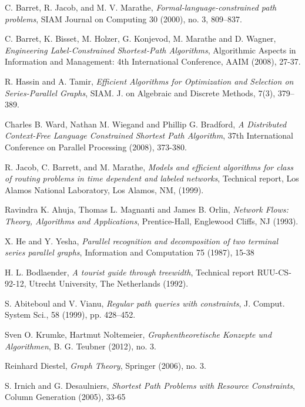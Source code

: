 \documentclass[]{article}
\numberwithin{equation}{section}
\begin{document}
\begin{thebibliography}{Lam00}
	C. Barret, R. Jacob, and M. V. Marathe,
	\emph{Formal-language-constrained path problems},
	SIAM Journal on Computing 30 (2000), no. 3, 809–837.
	
	C. Barret, K. Bisset, M. Holzer, G. Konjevod, M. Marathe and D. Wagner,
	\emph{Engineering Label-Constrained Shortest-Path Algorithms},
	Algorithmic Aspects in Information and Management: 4th International Conference, AAIM (2008), 27-37.
	
	R. Hassin and A. Tamir,
	\emph{Efficient Algorithms for Optimization and Selection on Series-Parallel Graphs},
	SIAM. J. on Algebraic and Discrete Methods, 7(3), 379–389.
	
	Charles B. Ward, Nathan M. Wiegand and Phillip G. Bradford,
	\emph{A Distributed Context-Free Language Constrained Shortest Path Algorithm},
	37th International Conference on Parallel Processing (2008), 373-380.
	
	R. Jacob, C. Barrett, and M. Marathe,
	\emph{Models and efficient algorithms for class of routing problems in time dependent and labeled networks},
	Technical report, Los Alamos National Laboratory, Los Alamos, NM, (1999).
	
	Ravindra K. Ahuja, Thomas L. Magnanti and James B. Orlin, 
	\emph{Network Flows: Theory, Algorithms and Applications}, 
	Prentice-Hall, Englewood Cliffs, NJ (1993).
	
	X. He and Y. Yesha,
	\emph{Parallel recognition and decomposition of two terminal series parallel graphs},
	Information and Computation 75 (1987), 15-38
	
	H. L. Bodlaender,
	\emph{A tourist guide through treewidth},
	Technical report RUU-CS-92-12, Utrecht University, The Netherlands (1992).
	
	S. Abiteboul and V. Vianu,
	\emph{Regular path queries with constraints},
	J. Comput. System Sci., 58 (1999), pp. 428–452.
	
	Sven O. Krumke, Hartmut Noltemeier,
	\emph{Graphentheoretische Konzepte und Algorithmen},
	B. G. Teubner (2012), no. 3.
	
	Reinhard Diestel,
	\emph{Graph Theory},
	Springer (2006), no. 3.
	
	S. Irnich and G. Desaulniers,
	\emph{Shortest Path Problems with Resource Constraints},
	Column Generation (2005), 33-65
	

\end{thebibliography}
\end{document}
